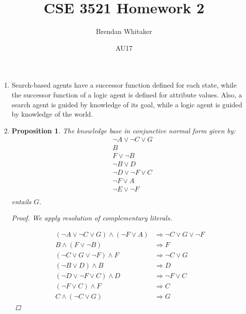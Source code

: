 \documentclass[10pt,oneside,reqno]{amsart}
\theoremstyle{plain}
\newtheorem{Prop}[Thm]{Proposition}
\theoremstyle{definition}
\begin{document}
\title{CSE 3521 Homework 2}

\date{AU17}

\author[Brendan Whitaker]{Brendan Whitaker}

\maketitle

\begin{enumerate}[label=\arabic*.]

\item Search-based agents have a successor function defined for each state, while the successor function of a logic agent is defined for attribute values. Also, a search agent is guided by knowledge of its goal, while a logic agent is guided by knowledge of the world. 

\item \begin{Prop}
The knowledge base in conjunctive normal form given by: 
\begin{equation}
\begin{aligned}
&\neg A \vee \neg C \vee G\\
&B\\
&F \vee \neg B\\
&\neg B \vee D\\
&\neg D \vee \neg F \vee C\\
&\neg F \vee A\\
&\neg E \vee \neg F\\
\end{aligned}
\end{equation}
entails $G$. 
\begin{proof}
We apply resolution of complementary literals. 

\begin{equation}
\begin{aligned}
(\neg A \vee \neg C \vee G) \wedge (\neg F \vee A) &\Rightarrow \neg C \vee G \vee \neg F\\
B \wedge (F \vee \neg B) &\Rightarrow F\\
(\neg C \vee G \vee \neg F) \wedge F &\Rightarrow \neg C \vee G \\
(\neg B \vee D) \wedge B &\Rightarrow D\\
(\neg D \vee \neg F \vee C) \wedge D &\Rightarrow \neg F \vee C\\
(\neg F \vee C) \wedge F &\Rightarrow C\\
C \wedge (\neg C \vee G) &\Rightarrow G
\end{aligned}
\end{equation}
\end{proof}


\end{Prop}
\end{enumerate}
\end{document}
